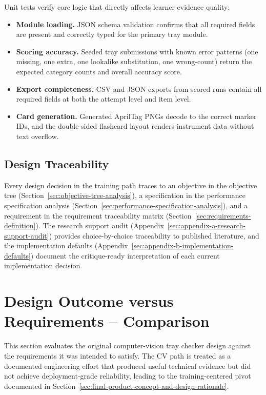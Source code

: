 \documentclass[10pt,a4paper]{article}
\begin{document}
Unit tests verify core logic that directly affects learner evidence quality:

\begin{itemize}
  \item \textbf{Module loading.} JSON schema validation confirms that all required
  fields are present and correctly typed for the primary tray module.
  \item \textbf{Scoring accuracy.} Seeded tray submissions with known error patterns
  (one missing, one extra, one lookalike substitution, one wrong-count) return
  the expected category counts and overall accuracy score.
  \item \textbf{Export completeness.} CSV and JSON exports from scored runs contain
  all required fields at both the attempt level and item level.
  \item \textbf{Card generation.} Generated AprilTag PNGs decode to the correct
  marker IDs, and the double-sided flashcard layout renders instrument data
  without text overflow.
\end{itemize}

\subsection{Design Traceability}
\label{sec:design-traceability}

Every design decision in the training path traces to an objective in the
objective tree (Section~\ref{sec:objective-tree-analysis}), a specification in
the performance specification analysis
(Section~\ref{sec:performance-specification-analysis}), and a requirement in
the requirement traceability matrix
(Section~\ref{sec:requirements-definition}). The research support audit
(Appendix~\ref{sec:appendix-a-research-support-audit}) provides
choice-by-choice traceability to published literature, and the implementation
defaults (Appendix~\ref{sec:appendix-b-implementation-defaults}) document the
critique-ready interpretation of each current implementation decision.




\section{Design Outcome versus Requirements -- Comparison}
\label{sec:design-outcome-versus-requirements-comparison}

This section evaluates the original computer-vision tray checker design against
the requirements it was intended to satisfy. The CV path is treated as a
documented engineering effort that produced useful technical evidence but did
not achieve deployment-grade reliability, leading to the training-centered
pivot documented in Section~\ref{sec:final-product-concept-and-design-rationale}.
\end{document}

